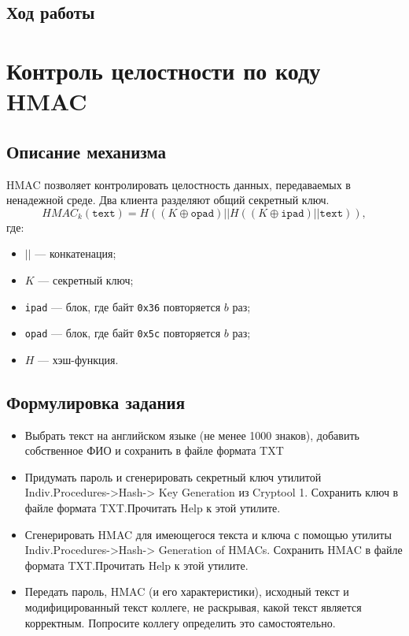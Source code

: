 \documentclass[a4paper, 14pt]{extarticle}
\begin{document}
\subsection{Ход работы}
\lipsum[1] %

\section{Контроль целостности по коду HMAC}
\subsection{Описание механизма}
HMAC позволяет контролировать целостность данных, передаваемых в ненадежной среде. Два клиента разделяют общий секретный ключ.
\begin{equation}
    HMAC_k(\mathtt{text}) = H((K \oplus \mathtt{opad}) || H ((K \oplus \mathtt{ipad}) || \mathtt{text}) ),
\end{equation}
где:
\begin{itemize}
    \item $||$ --- конкатенация;
    \item $K$ --- секретный ключ;
    \item \texttt{ipad} --- блок, где байт \texttt{0x36} повторяется $b$ раз;
    \item \texttt{opad} --- блок, где байт \texttt{0x5c} повторяется $b$ раз;
    \item $H$ --- хэш-функция.
\end{itemize}

\subsection{Формулировка задания}
\begin{itemize}
    \item  Выбрать текст на английском языке (не менее 1000 знаков), добавить собственное ФИО и сохранить в файле формата TXT
    \item  Придумать пароль и сгенерировать секретный ключ утилитой Indiv.Procedures->Hash-> Key Generation из Cryptool 1. Сохранить ключ в файле формата TXT.\@ Прочитать Help к этой утилите.
    \item  Сгенерировать HMAC для имеющегося текста и ключа с помощью утилиты Indiv.Procedures->Hash-> Generation of HMACs. Сохранить HMAC в файле формата TXT.\@ Прочитать Help к этой утилите.
    \item  Передать пароль, HMAC (и его характеристики), исходный текст и модифицированный текст коллеге, не раскрывая, какой текст является корректным. Попросите коллегу определить это самостоятельно.
\end{itemize}
\end{document}

